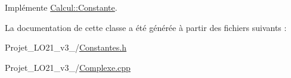 Implémente \hyperlink{class_calcul_1_1_constante_a80fb461841b16e6d5d1339802b69858e}{Calcul\-::\-Constante}.



La documentation de cette classe a été générée à partir des fichiers suivants \-:\begin{DoxyCompactItemize}
\item 
Projet\-\_\-\-L\-O21\-\_\-v3\-\_/\hyperlink{_constantes_8h}{Constantes.\-h}\item 
Projet\-\_\-\-L\-O21\-\_\-v3\-\_/\hyperlink{_complexe_8cpp}{Complexe.\-cpp}\end{DoxyCompactItemize}
